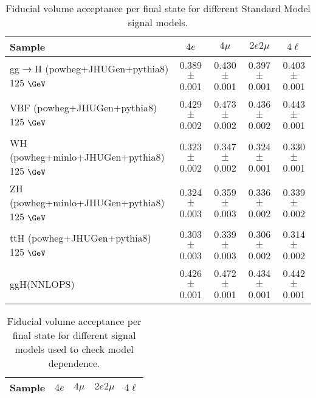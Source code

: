 \documentclass{article}
\begin{document}
\begin{table}[!h!tb]
\begin{center}
\small
\caption{
Fiducial volume acceptance per final state for different Standard Model signal models.
\label{tab:acceptanceSM}
}
\begin{tabular}{|l|c|c|c|c|} \hline 
Sample & $4e$ & $4\mu$ & $2e2\mu$ & $4\ell$ \\ \hline 
gg$\rightarrow$H ({\sc powheg+JHUGen+pythia8}) 125 $\GeV$ & 0.389 $\pm$ 0.001 & 0.430 $\pm$ 0.001 & 0.397 $\pm$ 0.001 & 0.403 $\pm$ 0.001 \\ 
VBF ({\sc powheg+JHUGen+pythia8}) 125 $\GeV$ & 0.429 $\pm$ 0.002 & 0.473 $\pm$ 0.002 & 0.436 $\pm$ 0.002 & 0.443 $\pm$ 0.001 \\ 
WH ({\sc powheg+minlo+JHUGen+pythia8}) 125 $\GeV$ & 0.323 $\pm$ 0.002 & 0.347 $\pm$ 0.002 & 0.324 $\pm$ 0.001 & 0.330 $\pm$ 0.001 \\ 
ZH ({\sc powheg+minlo+JHUGen+pythia8}) 125 $\GeV$ & 0.324 $\pm$ 0.003 & 0.359 $\pm$ 0.003 & 0.336 $\pm$ 0.002 & 0.339 $\pm$ 0.002 \\ 
ttH ({\sc powheg+JHUGen+pythia8}) 125 $\GeV$ & 0.303 $\pm$ 0.003 & 0.339 $\pm$ 0.003 & 0.306 $\pm$ 0.002 & 0.314 $\pm$ 0.002 \\ 
ggH(NNLOPS) & 0.426 $\pm$ 0.001 & 0.472 $\pm$ 0.001 & 0.434 $\pm$ 0.001 & 0.442 $\pm$ 0.001 \\ 

\hline
\end{tabular}
\normalsize
\end{center}
\end{table}
 
 
 
\begin{table}[!h!tb]
\begin{center}
\small
\caption{
Fiducial volume acceptance per final state for different signal models used to check model dependence.
\label{tab:acceptanceExo}
}
\begin{tabular}{|l|c|c|c|c|} \hline 
Sample & $4e$ & $4\mu$ & $2e2\mu$ & $4\ell$ \\ \hline 

\hline
\end{tabular}
\normalsize
\end{center}
\end{table}
 
 
 
\end{document}
